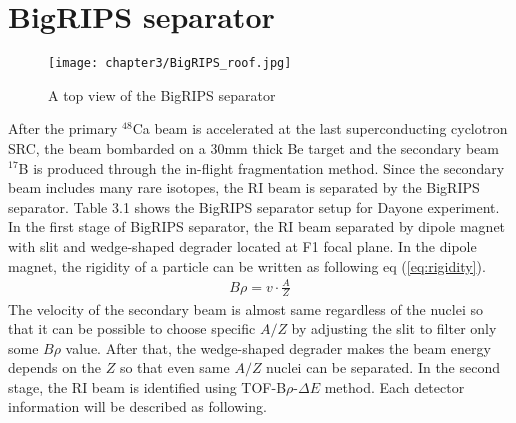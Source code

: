 \section{BigRIPS separator}

    \begin{figure}
        \centering
        \texttt{[image: chapter3/BigRIPS\_roof.jpg]}
        \caption{A top view of the BigRIPS separator \cite{Dayonewiki}}
        \label{fg:BigRIPS}
    \end{figure} 

After the primary ${}^{48}$Ca beam is accelerated at the last superconducting cyclotron SRC, the beam bombarded on a 30mm thick Be target and the secondary beam $^{17}$B is produced through the in-flight fragmentation method. Since the secondary beam includes many rare isotopes, the RI beam is separated by the BigRIPS separator. Table 3.1 shows the BigRIPS separator setup for Dayone experiment. In the first stage of BigRIPS separator, the RI beam separated by dipole magnet with slit and wedge-shaped degrader located at F1 focal plane. In the dipole magnet, the rigidity of a particle can be written as following eq (\ref{eq:rigidity}).
    \begin{align}
        B\rho = v \cdot \frac{A}{Z}  \label{eq:rigidity}
    \end{align}
The velocity of the secondary beam is almost same regardless of the nuclei so that it can be possible to choose specific $A/Z$ by adjusting the slit to filter only some $B\rho$ value. After that, the wedge-shaped degrader makes the beam energy depends on the $Z$ so that even same $A/Z$ nuclei can be separated. In the second stage, the RI beam is identified using TOF-B$\rho$-$\Delta E$ method. Each detector information will be described as following.

